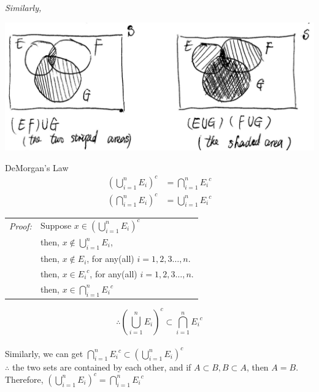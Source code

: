 \documentclass[11pt, letterpaper]{article}
\begin{document}
\clearpage
\textit{Similarly,} \\
\begin{center}
  \includegraphics[scale=0.55]{2-3}
\end{center}
DeMorgan's Law \\
\begin{align*}
  \left(\bigcup_{i=1}^n E_i\right)^c &= \bigcap_{i=1}^n {E_i}^c \\
  \left(\bigcap_{i=1}^n E_i\right)^c &= \bigcup_{i=1}^n {E_i}^c
\end{align*}
\begin{tabular}{l l}
  \textit{Proof:} & Suppose $x \in \left(\bigcup_{i=1}^n E_i\right)^c$ \\
                  & then, $x \not\in \bigcup_{i=1}^n E_i$, \\
                  & then, $x \not\in E_i$, for any(all) $i = 1,2,3\dots,n$. \\
                  & then, $x \in {E_i}^c$, for any(all) $i = 1,2,3\dots,n$. \\
                  & then, $x \in \bigcap_{i=1}^n {E_i}^c$
\end{tabular}
\begin{equation*}
  \therefore \left(\bigcup_{i=1}^n E_i \right)^c \subset \bigcap_{i=1}^n {E_i}^c
\end{equation*} \\
Similarly, we can get $\bigcap_{i=1}^n {E_i}^c \subset \left(\bigcup_{i=1}^n E_i \right)^c$ \\
$\therefore$ the two sets are contained by each other, and if $A \subset B, B \subset A$, then $A=B$. Therefore, $\left(\bigcup_{i=1}^n E_i \right)^c = \bigcap_{i=1}^n {E_i}^c$
\clearpage
\end{document}
